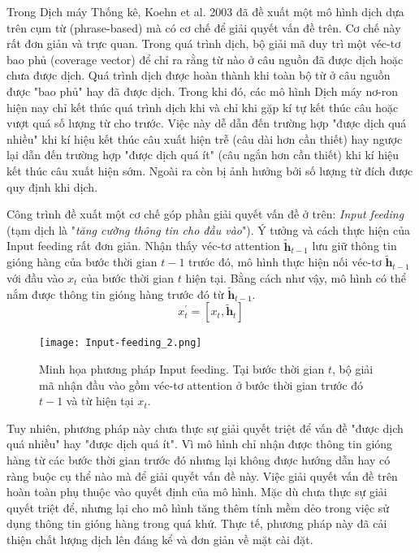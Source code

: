 Trong Dịch máy Thống kê, Koehn et al. 2003 \cite{smtKoehn2003} đã đề xuất một mô hình dịch dựa trên cụm từ (phrase-based) mà có cơ chế để giải quyết vấn đề trên. Cơ chế này rất đơn giản và trực quan. Trong quá trình dịch, bộ giải mã duy trì một véc-tơ bao phủ (coverage vector) để chỉ ra rằng từ nào ở câu nguồn đã được dịch hoặc chưa được dịch. Quá trình dịch được hoàn thành khi toàn bộ từ ở câu nguồn được "bao phủ" hay đã được dịch. Trong khi đó, các mô hình Dịch máy nơ-ron hiện nay chỉ kết thúc quá trình dịch khi và chỉ khi gặp kí tự kết thúc câu hoặc vượt quá số lượng từ cho trước. Việc này dễ dẫn đến trường hợp "được dịch quá nhiều" khi kí hiệu kết thúc câu xuất hiện trễ (câu dài hơn cần thiết) hay ngược lại dẫn đến trường hợp "được dịch quá ít" (câu ngắn hơn cần thiết) khi kí hiệu kết thúc câu xuất hiện sớm. Ngoài ra còn bị ảnh hưởng bởi số lượng từ đích được quy định khi dịch.

Công trình \cite{attentionThangLuong2015} đề xuất một cơ chế góp phần giải quyết vấn đề ở trên: \textit{Input feeding} (tạm dịch là "\textit{tăng cường thông tin cho đầu vào}"). Ý tưởng và cách thực hiện của Input feeding rất đơn giản. Nhận thấy véc-tơ attention $\bm{\tilde{h}}_{t-1}$ lưu giữ thông tin gióng hàng của bước thời gian $t-1$ trước đó, mô hình thực hiện nối véc-tơ $\bm{\tilde{h}}_{t-1}$ với đầu vào $x_t$ của bước thời gian $t$ hiện tại. Bằng cách như vậy, mô hình có thể nắm được thông tin gióng hàng trước đó từ $\bm{\tilde{h}}_{t-1}$.
\begin{equation}
x^{'}_t = [x_t, \bm{\tilde{h}}_t]
\end{equation}

\begin{figure}
	\centering
	\texttt{[image: Input-feeding\_2.png]}
	\caption[Minh họa cơ chế Attention Cục bộ.]{Minh họa phương pháp Input feeding. Tại bước thời gian $t$, bộ giải mã nhận đầu vào gồm véc-tơ attention ở bước thời gian trước đó $t-1$ và từ hiện tại $x_t$.}
	\label{fig_Input_feeding}
\end{figure}
Tuy nhiên, phương pháp này chưa thực sự giải quyết triệt để vấn đề "được dịch quá nhiều" hay "được dịch quá ít". Vì mô hình chỉ nhận được thông tin gióng hàng từ các bước thời gian trước đó nhưng lại không được hướng dẫn hay có ràng buộc cụ thể nào mà để giải quyết vấn đề này. Việc giải quyết vấn đề trên hoàn toàn phụ thuộc vào quyết định của mô hình. Mặc dù chưa thực sự giải quyết triệt để, nhưng lại cho mô hình tăng thêm tính mềm dẻo trong việc sử dụng thông tin gióng hàng trong quá khứ. Thực tế, phương pháp này đã cải thiện chất lượng dịch lên đáng kể và đơn giản về mặt cài đặt.

